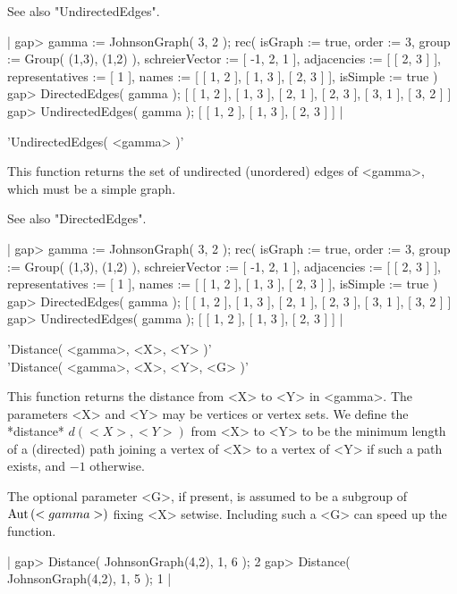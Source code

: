 See also "UndirectedEdges".

|    gap> gamma := JohnsonGraph( 3, 2 );
    rec(
      isGraph := true,
      order := 3,
      group := Group( (1,3), (1,2) ),
      schreierVector := [ -1, 2, 1 ],
      adjacencies := [ [ 2, 3 ] ],
      representatives := [ 1 ],
      names := [ [ 1, 2 ], [ 1, 3 ], [ 2, 3 ] ],
      isSimple := true )
    gap> DirectedEdges( gamma );
    [ [ 1, 2 ], [ 1, 3 ], [ 2, 1 ], [ 2, 3 ], [ 3, 1 ], [ 3, 2 ] ]
    gap> UndirectedEdges( gamma );
    [ [ 1, 2 ], [ 1, 3 ], [ 2, 3 ] ] |


'UndirectedEdges( <gamma> )'

This function returns the set of undirected (unordered) edges of <gamma>,
which must be a simple graph.

See also "DirectedEdges".

|    gap> gamma := JohnsonGraph( 3, 2 );
    rec(
      isGraph := true,
      order := 3,
      group := Group( (1,3), (1,2) ),
      schreierVector := [ -1, 2, 1 ],
      adjacencies := [ [ 2, 3 ] ],
      representatives := [ 1 ],
      names := [ [ 1, 2 ], [ 1, 3 ], [ 2, 3 ] ],
      isSimple := true )
    gap> DirectedEdges( gamma );
    [ [ 1, 2 ], [ 1, 3 ], [ 2, 1 ], [ 2, 3 ], [ 3, 1 ], [ 3, 2 ] ]
    gap> UndirectedEdges( gamma );
    [ [ 1, 2 ], [ 1, 3 ], [ 2, 3 ] ] |


'Distance( <gamma>, <X>, <Y> )' \\
'Distance( <gamma>, <X>, <Y>, <G> )'

This  function returns  the  distance  from <X>  to <Y>  in  <gamma>. The
parameters <X>  and <Y> may  be vertices or  vertex  sets. We  define the
*distance*  $d(<X>,<Y>)$ from  <X> to  <Y>  to be the minimum length of a
(directed) path joining a vertex of <X> to a vertex of <Y> if such a path
exists, and $-1$ otherwise.

The  optional parameter <G>,  if present, is assumed to  be a subgroup of
${\rm Aut}\,(<gamma>)$ fixing  <X>  setwise.  Including  such a <G> can speed up
the function.

|    gap> Distance( JohnsonGraph(4,2), 1, 6 );
    2
    gap> Distance( JohnsonGraph(4,2), 1, 5 );
    1 |


